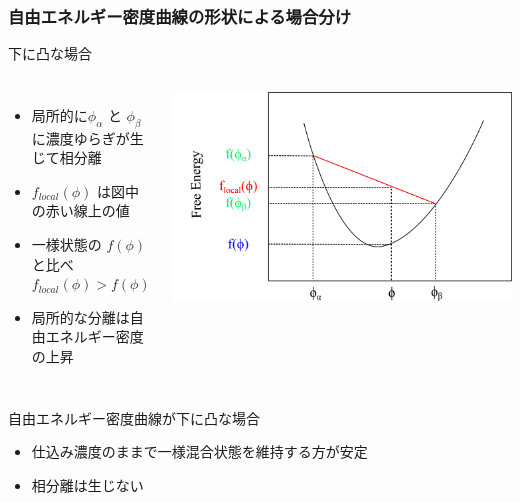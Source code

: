 \documentclass[12pt, dvipdfmx]{beamer}
\begin{document}
\begin{frame}
	\frametitle{自由エネルギー密度曲線の形状による場合分け}
		\begin{block}{下に凸な場合}
			\begin{columns}[c, onlytextwidth]
					\begin{itemize}
						\item 局所的に$\phi _\alpha$ と $\phi _\beta$ に濃度ゆらぎが生じて相分離
						\item $f_{local}(\phi)$ は図中の赤い線上の値
						\item 一様状態の $f (\phi)$ と比べ\\
						$f_{local}(\phi) > f (\phi)$
						\item \alert{局所的な分離は自由エネルギー密度の上昇}
					\end{itemize}
						\centering
							\includegraphics[width=\textwidth]{freeEform_2.png}
			\end{columns}
		\end{block}
 
		\begin{alertblock}{自由エネルギー密度曲線が下に凸な場合}
			\begin{itemize}
				\item 仕込み濃度のままで一様混合状態を維持する方が安定
				\item 相分離は生じない
			\end{itemize}
		\end{alertblock}
\end{frame}
\end{document}
